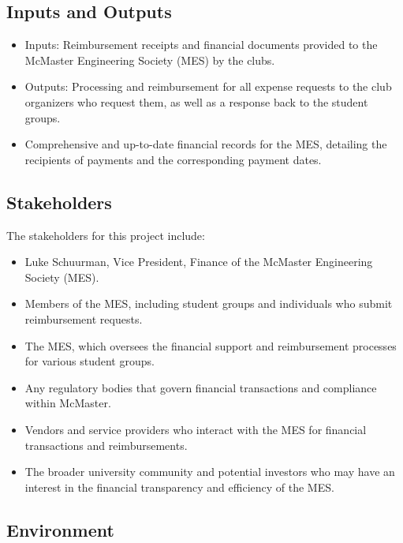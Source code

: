 \documentclass{article}
\begin{document}
\subsection{Inputs and Outputs}

\begin{itemize}
    \item Inputs: Reimbursement receipts and financial documents provided to the McMaster Engineering Society (MES) by the clubs.
    \item Outputs: Processing and reimbursement for all expense requests to the club organizers who request them, as well as a response back to the student groups.
    \item Comprehensive and up-to-date financial records for the MES, detailing the recipients of payments and the corresponding payment dates.
\end{itemize}

\subsection{Stakeholders}

\hspace{0.5cm} The stakeholders for this project include:

\begin{itemize}
    \item  Luke Schuurman, Vice President, Finance of the McMaster Engineering Society (MES).
    \item  Members of the MES, including student groups and individuals who submit reimbursement requests.
    \item The MES, which oversees the financial support and reimbursement processes for various student groups.
    \item Any regulatory bodies that govern financial transactions and compliance within McMaster.
    \item Vendors and service providers who interact with the MES for financial transactions and reimbursements.
    \item  The broader university community and potential investors who may have an interest in the financial transparency and efficiency of the MES.
\end{itemize}

\subsection{Environment}
\end{document}
